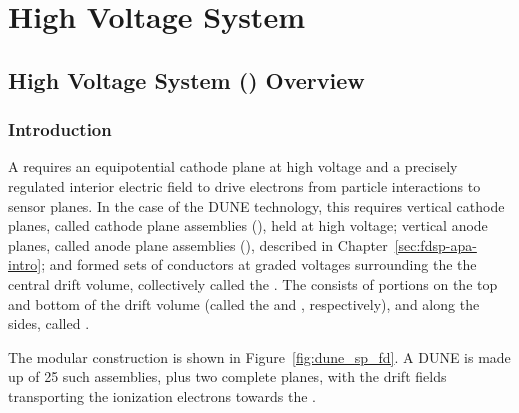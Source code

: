 \chapter{High Voltage System}
\label{ch:fdsp-hv}

\section{High Voltage System () Overview}
\label{sec:fdsp-hv-ov}


\subsection{Introduction}
\label{sec:fdsp-hv-intro}

A  requires an equipotential cathode plane at high voltage and a precisely regulated interior electric field to drive 
electrons from particle interactions to sensor planes.  In the case of the DUNE  technology, 
this requires vertical cathode planes, called cathode plane assemblies (), held at high voltage; vertical anode planes, called anode plane assemblies  (),  described in Chapter~\ref{sec:fdsp-apa-intro}; and formed sets of conductors at graded voltages surrounding the
 the central drift volume, collectively called the . The  consists of portions on the top and bottom  
of the drift volume (called the  and , respectively), and along the sides, called .


The modular  construction is shown in Figure~\ref{fig:dune_sp_fd}. A DUNE  is made up of 25 such assemblies, plus two complete   planes, with the  drift fields transporting the ionization electrons 
towards the .

